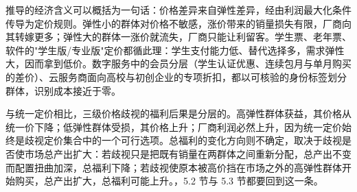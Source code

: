 推导的经济含义可以概括为一句话：价格差异来自弹性差异，经由利润最大化条件传导为定价规则。弹性小的群体对价格不敏感，涨价带来的销量损失有限，厂商向其转嫁更多；弹性大的群体一涨价就流失，厂商只能让利留客。学生票、老年票、软件的"学生版/专业版"定价都循此理：学生支付能力低、替代选择多，需求弹性大，因而拿到低价。数字服务中的会员分层（学生认证优惠、连续包月与单月购买的差价）、云服务商面向高校与初创企业的专项折扣，都以可核验的身份标签划分群体，识别成本接近于零。

与统一定价相比，三级价格歧视的福利后果是分层的。高弹性群体获益，其价格从统一价下降；低弹性群体受损，其价格上升；厂商利润必然上升，因为统一定价始终是歧视定价集合中的一个可行选项。总福利的变化方向则不确定，取决于歧视是否使市场总产出扩大：若歧视只是把既有销量在两群体之间重新分配，总产出不变而配置扭曲加深，总福利下降；若歧视使原本被高价挡在市场之外的高弹性群体开始购买，总产出扩大，总福利可能上升。，5.2 节与 5.3 节都要回到这一条。

